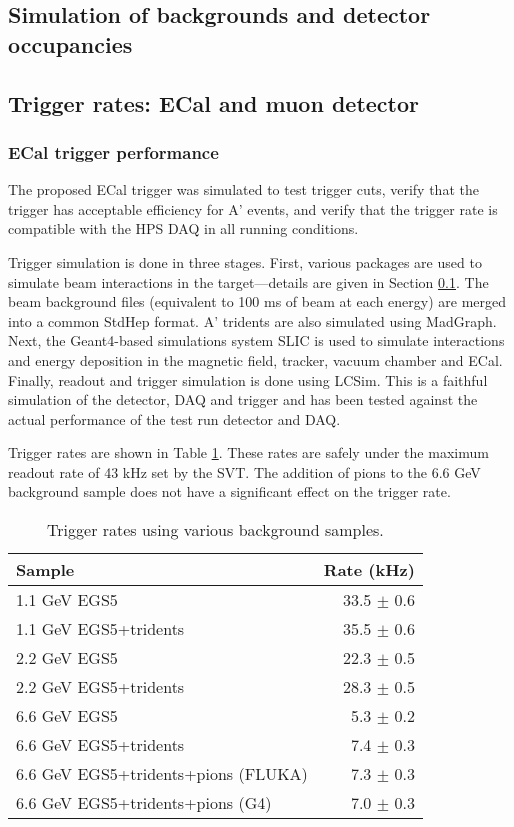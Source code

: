
\subsection{Simulation of backgrounds and detector occupancies}
\label{sec:backgrounds}


\subsection{Trigger rates: ECal and muon detector}
\subsubsection{ECal trigger performance}

The proposed ECal trigger was simulated to test trigger cuts, verify that the trigger has acceptable efficiency for A' events, and verify that the trigger rate is compatible with the HPS DAQ in all running conditions.

Trigger simulation is done in three stages. 
First, various packages are used to simulate beam interactions in the target---details are given in Section \ref{sec:backgrounds}.
The beam background files (equivalent to 100 ms of beam at each energy) are merged into a common StdHep format. 
A' tridents are also simulated using MadGraph. 
Next, the Geant4-based simulations system SLIC \cite{slic} is used to simulate interactions and energy deposition in the magnetic field, tracker, vacuum chamber and ECal. 
Finally, readout and trigger simulation is done using LCSim.
This is a faithful simulation of the detector, DAQ and trigger and has been tested against the actual performance of the test run detector and DAQ.

Trigger rates are shown in Table \ref{tab:trigrates}. These rates are safely under the maximum readout rate of 43 kHz set by the SVT. 
The addition of pions to the 6.6 GeV background sample does not have a significant effect on the trigger rate.

\begin{table}
	\begin{tabular}{|l|r|}
		\hline
		Sample &  Rate (kHz)\\
		\hline
		1.1 GeV	EGS5 				& 33.5 $\pm$ 0.6	\\
		1.1 GeV EGS5+tridents			& 35.5 $\pm$ 0.6	\\
		2.2 GeV	EGS5 				& 22.3 $\pm$ 0.5	\\
		2.2 GeV EGS5+tridents			& 28.3 $\pm$ 0.5	\\
		6.6 GeV	EGS5 				& 5.3 $\pm$ 0.2	\\
		6.6 GeV EGS5+tridents			& 7.4 $\pm$ 0.3	\\
		6.6 GeV EGS5+tridents+pions (FLUKA)	& 7.3 $\pm$ 0.3	\\
		6.6 GeV EGS5+tridents+pions (G4)	& 7.0 $\pm$ 0.3	\\
		\hline
	\end{tabular}
	\caption{ {\small Trigger rates using various background samples. }
	\label{tab:trigrates}}
\end{table}

